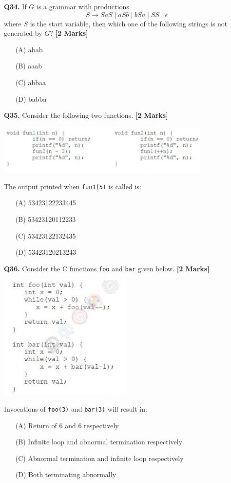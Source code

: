 \documentclass[11pt]{article}
\newcommand{\questionb}[2]{
    \noindent\textbf{Q#2.} #1 \hfill \textbf{[2 Marks]}
}
\begin{document}
\questionb{If \( G \) is a grammar with productions  
\[
S \rightarrow SaS \mid aSb \mid bSa \mid SS \mid \epsilon
\]  
where \( S \) is the start variable, then which one of the following strings is not generated by \( G \)?}{34}
\begin{enumerate}
    \item[(A)] abab  
    \item[(B)] aaab  
    \item[(C)] abbaa  
    \item[(D)] babba  
\end{enumerate}
\vspace{0.5cm}

\questionb{Consider the following two functions.}{35}
\begin{center}
\includegraphics[width=0.8\textwidth]{figures/35.png}
\end{center}
The output printed when \texttt{fun1(5)} is called is:
\begin{enumerate}
    \item[(A)] 53423122233445  
    \item[(B)] 53423120112233  
    \item[(C)] 53423122132435  
    \item[(D)] 53423120213243  
\end{enumerate}
\vspace{0.5cm}

\questionb{Consider the C functions \texttt{foo} and \texttt{bar} given below.}{36}
\begin{center}
\includegraphics[width=0.5\textwidth]{figures/36.png}
\end{center}
Invocations of \texttt{foo(3)} and \texttt{bar(3)} will result in:
\begin{enumerate}
    \item[(A)] Return of 6 and 6 respectively  
    \item[(B)] Infinite loop and abnormal termination respectively  
    \item[(C)] Abnormal termination and infinite loop respectively  
    \item[(D)] Both terminating abnormally  
\end{enumerate}
\vspace{0.5cm}
\end{document}
